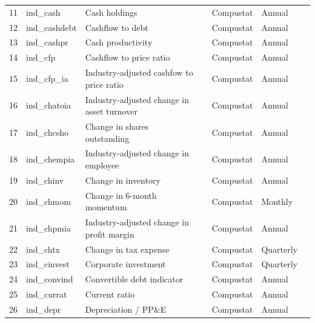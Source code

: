 \documentclass[a4paper, table]{article}
\begin{document}
\begin{landscape}
\begin{center}
\begin{longtable}{lllllll}
			11 & ind\_cash & Cash holdings & 
				\cite{palazzo_cash_2012} & Compustat & Annual \\
			12 & ind\_cashdebt & Cashflow to debt & 
				\cite{ou_financial_1989} & Compustat & Annual \\
			13 & ind\_cashpr & Cash productivity & 
				\cite{chandrashekar_productivity_2009} & Compustat & Annual \\
			14 & ind\_cfp\footnotemark[\value{footnote}] & Cashflow to price ratio & 
				\cite{desai_value-glamour_2004} & Compustat & Annual \\
			15 & ind\_cfp\_ia\footnotemark[\value{footnote}] & Industry-adjusted cashfow to price ratio & 
				\cite{asness_predicting_2000} & Compustat & Annual \\
			16 & ind\_chatoia\footnotemark[\value{footnote}] & Industry-adjusted change in asset turnover & 
				\cite{soliman_use_2008} & Compustat & Annual \\
			17 & ind\_chcsho & Change in shares outstanding & 
				\cite{pontiff_share_2008} & Compustat & Annual \\
			18 & ind\_chempia & Industry-adjusted change in employee & 
				\cite{asness_predicting_2000} & Compustat & Annual \\
			19 & ind\_chinv\footnotemark[\value{footnote}] & Change in inventory & 
				\cite{thomas_inventory_2002} & Compustat & Annual \\
			20 & ind\_chmom & Change in 6-month momentum & 
				\cite{gettleman_acceleration_2006} & Compustat & Monthly \\
			21 & ind\_chpmia\footnotemark[\value{footnote}] & Industry-adjusted change in profit margin & 
				\cite{soliman_use_2008} & Compustat & Annual \\
			22 & ind\_chtx & Change in tax expense & 
				\cite{thomas_tax_2011} & Compustat & Quarterly \\
			23 & ind\_cinvest & Corporate investment & 
				\cite{titman_capital_2004} & Compustat & Quarterly \\
			24 & ind\_convind & Convertible debt indicator & 
				\cite{valta_strategic_2016} & Compustat & Annual \\
			25 & ind\_currat & Current ratio & 
				\cite{ou_financial_1989} & Compustat & Annual \\
			26 & ind\_depr & Depreciation / PP\&E & 
				\cite{holthausen_prediction_1992} & Compustat & Annual \\

\end{longtable}
\end{center}
\end{landscape}
\end{document}
